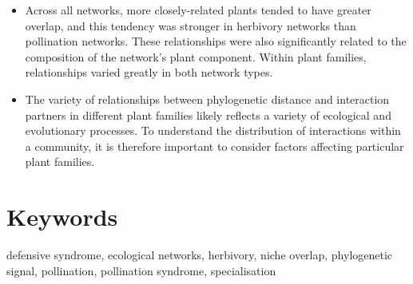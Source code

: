 \documentclass[12pt]{article}
\begin{document}
\begin{spacing}{1.0}
\begin{itemize}
    \item Across all networks, more closely-related plants tended to have 
          greater overlap, and this tendency was stronger in herbivory 
          networks than pollination networks. These relationships were also significantly related 
          to the composition of the network's plant component. Within plant families, 
          relationships varied greatly in both network types. 

    \item The variety of relationships between phylogenetic distance and
          interaction partners in different plant families likely
          reflects a variety of ecological and evolutionary processes. To 
          understand the distribution of interactions within a community, 
          it is therefore important to consider factors affecting particular 
          plant families.

  \end{itemize}


\section*{Keywords}

defensive syndrome, ecological networks, herbivory, niche overlap, phylogenetic signal, pollination, pollination syndrome, specialisation

\end{spacing}
\end{document}
